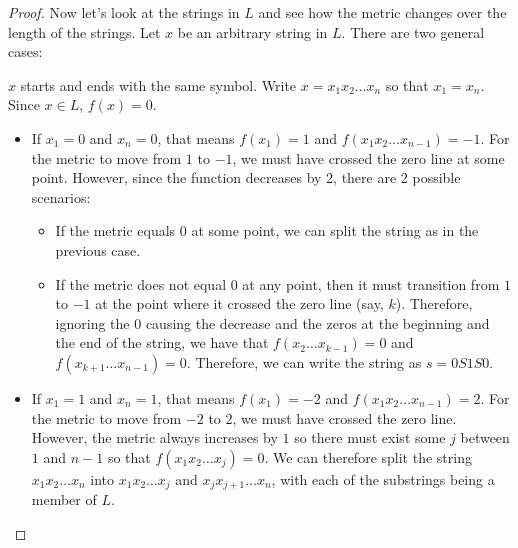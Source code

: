 \begin{problem}
\begin{enumalph}
\begin{Answer}
\begin{claim}
\begin{proof}
            Now let's look at the strings in $L$ and see how the metric changes
            over the length of the strings.
            Let $x$ be an arbitrary string in $L$.
            There are two general cases:
            \begin{enumroman}
              \item $x$ starts and ends with the same symbol.
                Write $x = x_1x_2 \ldots x_n$ so that $x_1 = x_n$.
                Since $x \in L$, $f(x) = 0$.
                \begin{itemize}
                  \item If $x_1 = 0$ and $x_n = 0$, that means
                    $f(x_1) = 1$ and $f(x_1x_2\ldots x_{n-1}) = -1$.
                    For the metric to move from $1$ to $-1$, we must have
                    crossed the zero line at some point. However, since the function
                    decreases by $2$, there are 2 possible scenarios:
                    \begin{itemize}
                      \item If the metric equals $0$ at some point,
                        we can split the string as in the previous case.
                      \item If the metric does not equal $0$ at any point,
                        then it must transition from $1$ to $-1$ at the point
                        where it crossed the zero line (say, $k$).
                        Therefore, ignoring the $0$ causing the decrease
                        and the zeros at the beginning and the end of the string,
                        we have that $f(x_2\ldots x_{k-1}) = 0$
                        and $f(x_{k+1}\ldots x_{n-1}) = 0$.
                        Therefore, we can write the string as $s = 0S1S0$.
                    \end{itemize}
                  \item If $x_1 = 1$ and $x_n = 1$, that means
                    $f(x_1) = -2$ and $f(x_1x_2\ldots x_{n-1}) = 2$.
                    For the metric to move from $-2$ to $2$, we must have
                    crossed the zero line. However, the metric always
                    increases by $1$ so there must exist some $j$ between $1$ and $n-1$
                    so that $f(x_1x_2\ldots x_j) = 0$.
                    We can therefore split the string $x_1x_2\ldots x_n$ into
                    $x_1x_2\ldots x_j$ and $x_jx_{j+1}\ldots x_n$, with each of the substrings
                    being a member of $L$.
                  

\end{itemize}
\end{enumroman}
\end{proof}
\end{claim}
\end{Answer}
\end{enumalph}
\end{problem}
